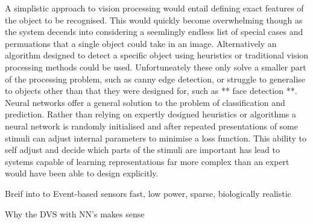 A simplistic approach to vision processing would entail defining exact features of the object to be recognised.
This would quickly become overwhelming though as the system decends into considering a seemlingly endless list of special cases and permuations that a single object could take in an image.
Alternatively an algorithm designed to detect a specific object using heuristics or traditional vision processing methods could be used.
Unfortuneately these only solve a smaller part of the processing problem, such as canny edge detection, or struggle to generalise to objects other than that they were designed for, such as ** face detection **.
Neural networks offer a general solution to the problem of classification and prediction.
Rather than relying on expertly designed heuristics or algorithms a neural network is randomly initialised and after repeated presentations of some stimuli can adjust internal parameters to minimise a loss function. 
This ability to self adjust and decide which parts of the stimuli are important has lead to systems capable of learning representations far more complex than an expert would have been able to design explicitly. 


Breif into to Event-based sensors \hfill 
   fast, low power, sparse, biologically realistic \hfill

Why the DVS with NN's makes sense \hfill 


